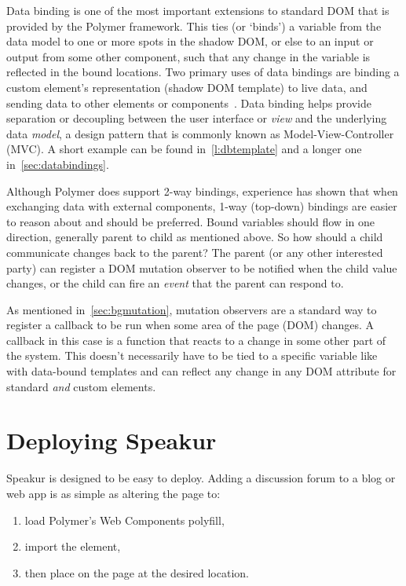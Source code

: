 Data binding is one of the most important extensions to standard DOM that is provided by the Polymer framework. 
This ties (or `binds') a variable from the data model to one or more spots in the shadow DOM, or else to an input or output from some other component, 
such that any change in the variable is reflected in the bound locations.
Two primary uses of data bindings are
binding a custom element's representation (shadow DOM template) to live data, 
and sending data to other elements or components~\cite{polymercontributors2015-b}. 
Data binding helps provide separation or decoupling between the user interface or \textit{view} and the underlying data \textit{model}, 
a design pattern that is commonly known as 
Model-View-Controller (MVC).
A short example can be found in~\cref{l:dbtemplate} and a longer one in~\cref{sec:databindings}.

Although Polymer does support 2-way bindings, 
experience has shown that when exchanging data with external components, 1-way (top-down) bindings are easier to reason about and should be preferred.
Bound variables should flow in one direction, generally parent to child as mentioned above.
So how should a child communicate changes back to the parent? 
The parent (or any other interested party) can register a DOM mutation observer to be notified when the child value changes, or the child can fire an \textit{event} that the parent can respond to.

As mentioned in~\cref{sec:bgmutation}, 
mutation observers are a standard way to register a callback to be run when some area of the page (DOM) changes. 
A callback in this case is a function that reacts to a change in some other part of the system.
This doesn't necessarily have to be tied to a specific variable like with data-bound templates and can reflect any change in any DOM attribute for standard \textit{and} custom elements. 

\section{Deploying Speakur}
Speakur is designed to be easy to deploy.
Adding a discussion forum to a blog or web app is as simple as altering the page to:

\begin{enumerate}
\item load Polymer's Web Components polyfill,
\item import the  element,
\item then place  on the page at the desired location. 
\end{enumerate}

